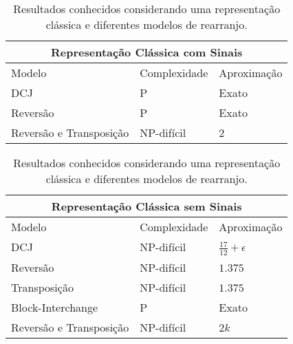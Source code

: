 \begin{table}[!htb]\label{table:XZPFGPAM}
  \caption[Resultados conhecidos considerando uma representação clássica e diferentes modelos de rearranjo.]{Resultados conhecidos considerando uma representação clássica e diferentes modelos de rearranjo.}
  \centering
  \begin{tabular}{|p{8cm}|p{3cm}|p{3cm}|}
    \hline
    \multicolumn{3}{|c|}{Representação Clássica com Sinais}                                                                      \\ \hline
    Modelo                  & Complexidade                                 & Aproximação                                         \\ \hline
    DCJ                     & P~\cite{2005-yancopoulos-etal}               & Exato~\cite{2005-yancopoulos-etal}                  \\ \hline
    Reversão                & P~\cite{1999-hannenhalli-pevzner}            & Exato~\cite{1999-hannenhalli-pevzner}               \\ \hline
    Reversão e Transposição & NP-difícil~\cite{2019b-oliveira-etal}        & $2$~\cite{1998-walter-etal}                         \\ \hline
  \end{tabular}

  \hfill \break

  \begin{tabular}{|p{8cm}|p{3cm}|p{3cm}|}
    \hline
    \multicolumn{3}{|c|}{Representação Clássica sem Sinais}                                                                      \\ \hline
    Modelo                  & Complexidade                                 & Aproximação                                         \\ \hline
    DCJ                     & NP-difícil~\cite{2013-chen}                  & $\frac{17}{12}+\epsilon$~\cite{2013-chen}           \\ \hline
    Reversão                & NP-difícil~\cite{1999-caprara}               & $1.375$~\cite{2002-berman-etal}                     \\ \hline
    Transposição            & NP-difícil~\cite{2012-bulteau-etal}          & $1.375$~\cite{2006-elias-hartman,2022-silva-etal}   \\ \hline
    Block-Interchange       & P~\cite{1996-christie}                       & Exato~\cite{1996-christie}                          \\ \hline
    Reversão e Transposição & NP-difícil~\cite{2019b-oliveira-etal}        & $2k$~\cite{2008-rahman-etal,2013-chen}              \\ \hline
  \end{tabular}
\end{table}
